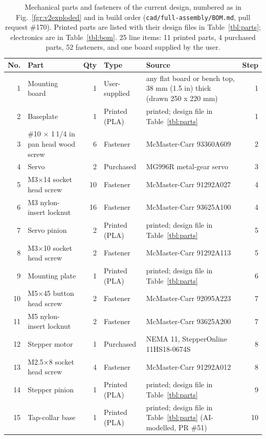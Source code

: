 \documentclass[10pt]{article}
\begin{document}
\begin{table}[htbp]
\centering
\footnotesize
\caption{Mechanical parts and fasteners of the current design, numbered as in Fig.~\ref{fgr:v2exploded} and in build order (\texttt{cad/full-assembly/BOM.md}, pull request \#170). Printed parts are listed with their design files in Table~\ref{tbl:parts}; electronics are in Table~\ref{tbl:bom}. 25 line items: 11 printed parts, 4 purchased parts, 52 fasteners, and one board supplied by the user.}
\label{tbl:mechbom}
\begin{tabular}{rp{5.2cm}rp{2.0cm}p{5.0cm}r}
\toprule
No. & Part & Qty & Type & Source & Step \\
\midrule
1 & Mounting board & 1 & User-supplied & any flat board or bench top, 38 mm (1.5 in) thick (drawn 250 x 220 mm) & 1 \\
2 & Baseplate & 1 & Printed (PLA) & printed; design file in Table~\ref{tbl:parts} & 1 \\
3 & \#10 $\times$ 1\,1/4 in pan head wood screw & 6 & Fastener & McMaster-Carr 93360A609 & 2 \\
4 & Servo & 2 & Purchased & MG996R metal-gear servo & 3 \\
5 & M3$\times$14 socket head screw & 10 & Fastener & McMaster-Carr 91292A027 & 4 \\
6 & M3 nylon-insert locknut & 16 & Fastener & McMaster-Carr 93625A100 & 4 \\
7 & Servo pinion & 2 & Printed (PLA) & printed; design file in Table~\ref{tbl:parts} & 5 \\
8 & M3$\times$10 socket head screw & 2 & Fastener & McMaster-Carr 91292A113 & 5 \\
9 & Mounting plate & 1 & Printed (PLA) & printed; design file in Table~\ref{tbl:parts} & 6 \\
10 & M5$\times$45 button head screw & 2 & Fastener & McMaster-Carr 92095A223 & 7 \\
11 & M5 nylon-insert locknut & 2 & Fastener & McMaster-Carr 93625A200 & 7 \\
12 & Stepper motor & 1 & Purchased & NEMA 11, StepperOnline 11HS18-0674S & 8 \\
13 & M2.5$\times$8 socket head screw & 4 & Fastener & McMaster-Carr 91292A012 & 8 \\
14 & Stepper pinion & 1 & Printed (PLA) & printed; design file in Table~\ref{tbl:parts} & 9 \\
15 & Tap-collar base & 1 & Printed (PLA) & printed; design file in Table~\ref{tbl:parts} (AI-modelled, PR \#51) & 10 \\

\end{tabular}
\end{table}
\end{document}
